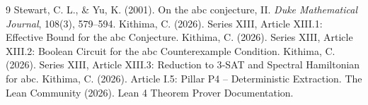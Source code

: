 \documentclass[11pt,a4paper]{article}
\begin{document}

\begin{thebibliography}{9}
  Stewart, C. L., \& Yu, K. (2001). On the abc conjecture, II. \emph{Duke Mathematical Journal}, 108(3), 579–594.
  Kithima, C. (2026). Series XIII, Article XIII.1: Effective Bound for the abc Conjecture.
  Kithima, C. (2026). Series XIII, Article XIII.2: Boolean Circuit for the abc Counterexample Condition.
  Kithima, C. (2026). Series XIII, Article XIII.3: Reduction to 3‑SAT and Spectral Hamiltonian for abc.
  Kithima, C. (2026). Article I.5: Pillar P4 – Deterministic Extraction.
  The Lean Community (2026). Lean 4 Theorem Prover Documentation.
\end{thebibliography}
\end{document}
